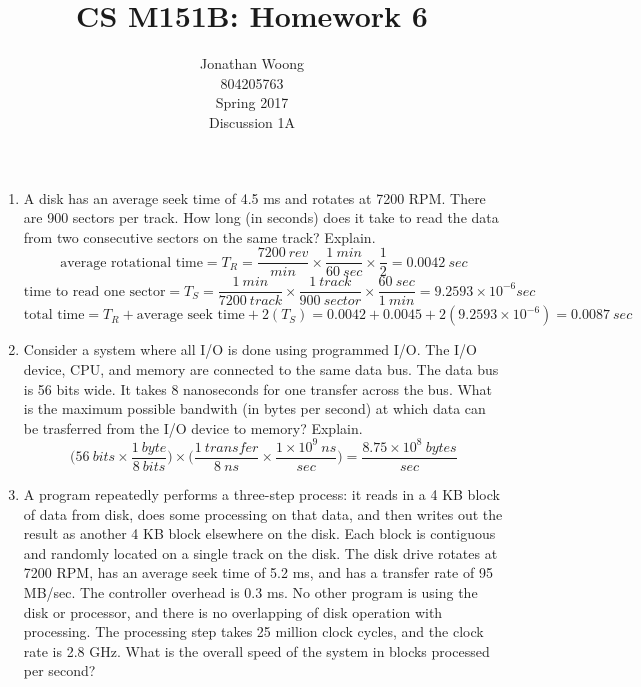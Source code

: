 \documentclass[10pt,letterpaper]{article}
\date{\displaydate{date}}
\begin{document}
\title{CS M151B: Homework 6}
\author{
	Jonathan Woong\\
	804205763\\
	Spring 2017\\
	Discussion 1A}
\maketitle
\pagebreak


\begin{enumerate}[label=\textbf{Problem \arabic*.}]
\item A disk has an average seek time of 4.5 ms and rotates at 7200 RPM. There are 900 sectors per track. How long (in seconds) does it take to read the data from two consecutive sectors on the same track? Explain.
\[\text{average rotational time} = T_R = \frac{7200 \ rev}{min} \times \frac{1 \  min}{60 \ sec} \times \frac{1}{2} = 0.0042 \ sec\]
\[\text{time to read one sector} = T_S = \frac{1 \ min}{7200 \ track} \times \frac{1 \ track}{900 \ sector} \times \frac{60 \ sec}{1 \ min} = 9.2593 \times 10^{-6} sec\]
\[\boxed{\text{total time} = T_R + \text{average seek time} + 2(T_S) = 0.0042 + 0.0045 + 2(9.2593 \times 10^{-6}) = 0.0087 \ sec}\]
\item Consider a system where all I/O is done using programmed I/O. The I/O device, CPU, and memory are connected to the same data bus. The data bus is 56 bits wide. It takes 8 nanoseconds for one transfer across the bus. What is the maximum possible bandwith (in bytes per second) at which data can be trasferred from the I/O device to memory? Explain.
\[\bigg(56 \ bits \times \frac{1 \ byte}{8 \ bits}\bigg) \times \bigg(\frac{1 \ transfer}{8 \ ns} \times \frac{1 \times 10^9 \ ns}{sec}\bigg) = \boxed{\frac{8.75 \times 10^8 \ bytes}{sec}}\]
\item A program repeatedly performs a three-step process: it reads in a 4 KB block of data from disk, does some processing on that data, and then writes out the result as another 4 KB block elsewhere on the disk. Each block is contiguous and randomly located on a single track on the disk. The disk drive rotates at 7200 RPM, has an average seek time of 5.2 ms, and has a transfer rate of 95 MB/sec. The controller overhead is 0.3 ms. No other program is using the disk or processor, and there is no overlapping of disk operation with processing. The processing step takes 25 million clock cycles, and the clock rate is 2.8 GHz. What is the overall speed of the system in blocks processed per second?

\end{enumerate}
\end{document}
